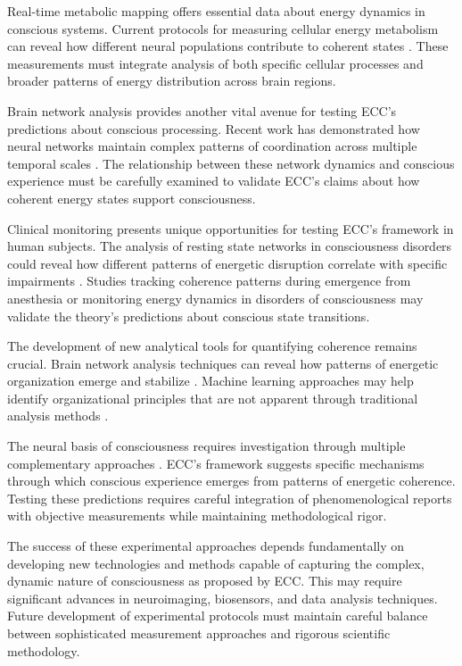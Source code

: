 Real-time metabolic mapping offers essential data about energy dynamics in conscious systems. Current protocols for measuring cellular energy metabolism can reveal how different neural populations contribute to coherent states \cite{Zhang2019}. These measurements must integrate analysis of both specific cellular processes and broader patterns of energy distribution across brain regions. 

Brain network analysis provides another vital avenue for testing ECC's predictions about conscious processing. Recent work has demonstrated how neural networks maintain complex patterns of coordination across multiple temporal scales \cite{Palva2018}. The relationship between these network dynamics and conscious experience must be carefully examined to validate ECC's claims about how coherent energy states support consciousness.

Clinical monitoring presents unique opportunities for testing ECC's framework in human subjects. The analysis of resting state networks in consciousness disorders could reveal how different patterns of energetic disruption correlate with specific impairments \cite{Fox2010}. Studies tracking coherence patterns during emergence from anesthesia or monitoring energy dynamics in disorders of consciousness may validate the theory's predictions about conscious state transitions.

The development of new analytical tools for quantifying coherence remains crucial. Brain network analysis techniques can reveal how patterns of energetic organization emerge and stabilize \cite{DePasquale2020}. Machine learning approaches may help identify organizational principles that are not apparent through traditional analysis methods \cite{Buzsaki2019}.

The neural basis of consciousness requires investigation through multiple complementary approaches \cite{Kucyi2017}. ECC's framework suggests specific mechanisms through which conscious experience emerges from patterns of energetic coherence. Testing these predictions requires careful integration of phenomenological reports with objective measurements while maintaining methodological rigor.

The success of these experimental approaches depends fundamentally on developing new technologies and methods capable of capturing the complex, dynamic nature of consciousness as proposed by ECC. This may require significant advances in neuroimaging, biosensors, and data analysis techniques. Future development of experimental protocols must maintain careful balance between sophisticated measurement approaches and rigorous scientific methodology.